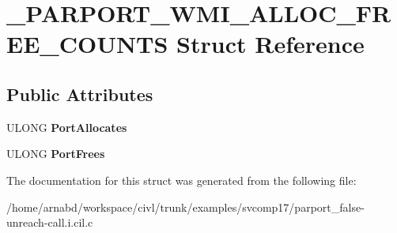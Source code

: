 \hypertarget{struct__PARPORT__WMI__ALLOC__FREE__COUNTS}{}\section{\+\_\+\+P\+A\+R\+P\+O\+R\+T\+\_\+\+W\+M\+I\+\_\+\+A\+L\+L\+O\+C\+\_\+\+F\+R\+E\+E\+\_\+\+C\+O\+U\+N\+T\+S Struct Reference}
\label{struct__PARPORT__WMI__ALLOC__FREE__COUNTS}
\subsection*{Public Attributes}
\begin{DoxyCompactItemize}
\item 
\hypertarget{struct__PARPORT__WMI__ALLOC__FREE__COUNTS_a9332235669c1eeb113d78a509ef7c72e}{}U\+L\+O\+N\+G {\bfseries Port\+Allocates}\label{struct__PARPORT__WMI__ALLOC__FREE__COUNTS_a9332235669c1eeb113d78a509ef7c72e}

\item 
\hypertarget{struct__PARPORT__WMI__ALLOC__FREE__COUNTS_a49ec59e7c2e774bcae07eb03cdfcff25}{}U\+L\+O\+N\+G {\bfseries Port\+Frees}\label{struct__PARPORT__WMI__ALLOC__FREE__COUNTS_a49ec59e7c2e774bcae07eb03cdfcff25}

\end{DoxyCompactItemize}


The documentation for this struct was generated from the following file\+:\begin{DoxyCompactItemize}
\item 
/home/arnabd/workspace/civl/trunk/examples/svcomp17/parport\+\_\+false-\/unreach-\/call.\+i.\+cil.\+c\end{DoxyCompactItemize}
